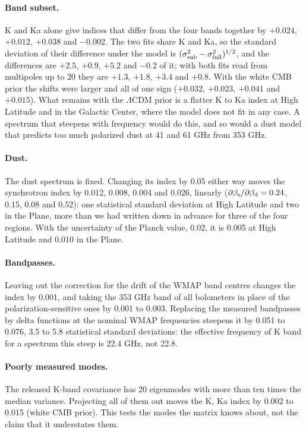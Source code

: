 \paragraph{Band subset.} K and Ka alone give indices that differ from the four bands together by
$+0.024$, $+0.012$, $+0.038$ and $-0.002$. The two fits share K and Ka, so the standard deviation of their difference
under the model is $(\sigma_{\rm sub}^2 - \sigma_{\rm full}^2)^{1/2}$, and the differences are
$+2.5$, $+0.9$, $+5.2$ and $-0.2$ of it; with both fits read from multipoles up to 20 they are
$+1.3$, $+1.8$, $+3.4$ and $+0.8$. With the white CMB prior the shifts were larger and all of one
sign ($+0.032$, $+0.023$, $+0.041$ and $+0.015$). What remains with the $\Lambda$CDM prior is a flatter K
to Ka index at High Latitude and in the Galactic Center, where the model does not fit in any case. A
spectrum that steepens with frequency would do this, and so would a dust model that predicts too much
polarized dust at 41 and 61 GHz from 353 GHz.

\paragraph{Dust.} The dust spectrum is fixed. Changing its index by 0.05 either way moves the
synchrotron index by 0.012, 0.008, 0.004 and 0.026, linearly ($\partial\beta_{\rm s}/\partial\beta_{\rm d} =
0.24$, $0.15$, $0.08$ and $0.52$): one statistical standard deviation at High Latitude
and two in the Plane, more than we had written down in advance for three of the four regions. With the
uncertainty of the Planck value, 0.02,
it is 0.005 at High Latitude and 0.010 in the Plane.

\paragraph{Bandpasses.} Leaving out the correction for the drift of the WMAP band centres changes the
index by 0.001, and taking the 353 GHz band of all bolometers in place of the
polarization-sensitive ones by 0.001 to 0.003. Replacing the measured bandpasses by delta functions at
the nominal WMAP frequencies steepens it by 0.051 to 0.076, 3.5 to 5.8 statistical standard
deviations: the effective frequency of K band for a spectrum this steep is 22.4 GHz, not 22.8.

\paragraph{Poorly measured modes.} The released K-band covariance has 20 eigenmodes with more than
ten times the median variance. Projecting all of them out moves the K, Ka index by 0.002 to 0.015
(white CMB prior). This tests the modes the matrix knows about, not the claim that it understates
them.

